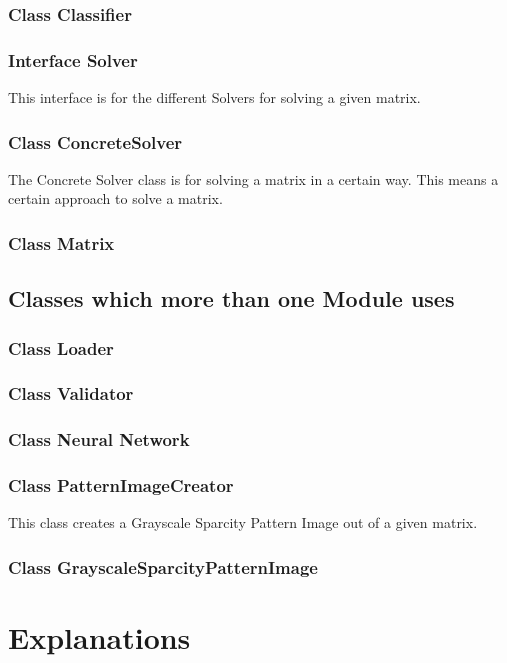 \documentclass[parskip=full]{scrartcl}
\begin{document}
\subsubsection{Class Classifier}
\subsubsection{Interface Solver}
This interface is for the different Solvers for solving a given matrix.
\subsubsection{Class ConcreteSolver}
The Concrete Solver class is for solving a matrix in a certain way.
This means a certain approach to solve a matrix.
\subsubsection{Class Matrix}
\subsection{Classes which more than one Module uses}
\subsubsection{Class Loader}

\subsubsection{Class Validator}

\subsubsection{Class Neural Network}

\subsubsection{Class PatternImageCreator}
This class creates a Grayscale Sparcity Pattern Image out of a given matrix.
\subsubsection{Class GrayscaleSparcityPatternImage}




\section{Explanations}
\end{document}
